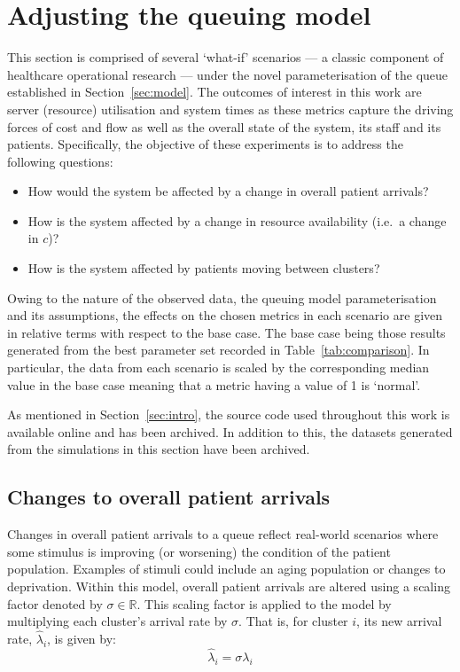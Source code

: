 \section{Adjusting the queuing model}\label{sec:scenarios}

This section is comprised of several `what-if' scenarios --- a classic component
of healthcare operational research --- under the novel parameterisation of the
queue established in Section~\ref{sec:model}. The outcomes of interest in this
work are server (resource) utilisation and system times as these metrics capture
the driving forces of cost and flow as well as the overall state of the system,
its staff and its patients. Specifically, the objective of these experiments is
to address the following questions:
\begin{itemize}
    \item How would the system be affected by a change in overall patient
        arrivals?
    \item How is the system affected by a change in resource availability (i.e.\
        a change in \(c\))?
    \item How is the system affected by patients moving between clusters?
\end{itemize}

Owing to the nature of the observed data, the queuing model parameterisation
and its assumptions, the effects on the chosen metrics in each scenario are
given in relative terms with respect to the base case. The base case being those
results generated from the best parameter set recorded in
Table~\ref{tab:comparison}. In particular, the data from each scenario is scaled
by the corresponding median value in the base case meaning that a metric having
a value of 1 is `normal'.

As mentioned in Section~\ref{sec:intro}, the source code used throughout this
work is available online and has been archived. %
In addition to this, the datasets generated from the simulations in this section
have been archived. %


\subsection{Changes to overall patient arrivals}\label{subsec:arrivals}

Changes in overall patient arrivals to a queue reflect real-world scenarios
where some stimulus is improving (or worsening) the condition of the patient
population. Examples of stimuli could include an aging population or
changes to deprivation. Within this model, overall patient arrivals are altered
using a scaling factor denoted by \(\sigma\in\mathbb{R}\). This scaling factor
is applied to the model by multiplying each cluster's arrival rate by
\(\sigma\). That is, for cluster \(i\), its new arrival rate, \(\hat\lambda_i\),
is given by:
\begin{equation}\label{eq:lambda}
    \hat\lambda_{i} = \sigma\lambda_i
\end{equation}


